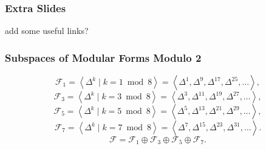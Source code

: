 \begin{frame}
	\frametitle{Extra Slides} 
	
	
	
	\vspace{1cm}
	
	add some useful links?
\end{frame}


\begin{frame}
	\frametitle{Subspaces of Modular Forms Modulo 2}
	$$
	\mathcal{F}_1
	= \left\langle \Delta^k \mid k = 1 \bmod 8 \right\rangle
	= \left\langle \Delta^1, \Delta^9, \Delta^{17}, \Delta^{25}, \dots \right\rangle,
	$$
	$$
	\mathcal{F}_3
	= \left\langle \Delta^k \mid k = 3 \bmod 8 \right\rangle
	= \left\langle \Delta^3, \Delta^{11}, \Delta^{19}, \Delta^{27}, \dots \right\rangle,
	$$
	$$
	\mathcal{F}_5
	= \left\langle \Delta^k \mid k = 5 \bmod 8 \right\rangle
	= \left\langle \Delta^5, \Delta^{13}, \Delta^{21}, \Delta^{29}, \dots \right\rangle,
	$$
	$$
	\mathcal{F}_7
	= \left\langle \Delta^k \mid k = 7 \bmod 8 \right\rangle
	= \left\langle \Delta^7, \Delta^{15}, \Delta^{23}, \Delta^{31}, \dots \right\rangle.
	$$
	$$
	\mathcal{F} = \mathcal{F}_1 \oplus \mathcal{F}_3 \oplus \mathcal{F}_5 \oplus \mathcal{F}_7.
	$$
\end{frame}